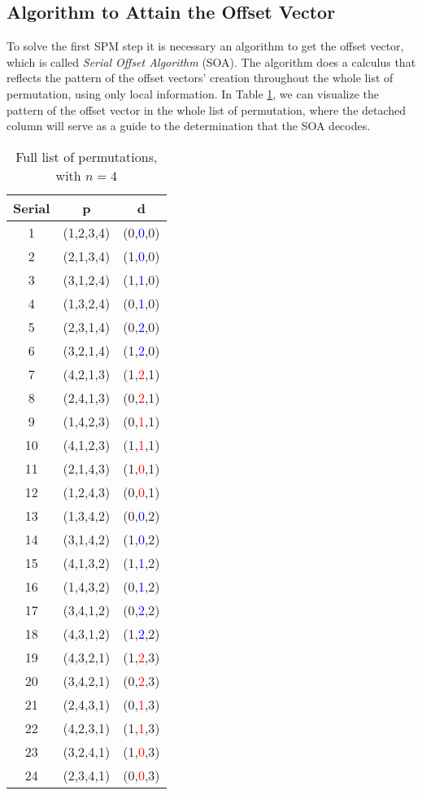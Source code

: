 \documentclass {amsart}
\newcommand{\azero}{\textcolor{blue}{0}}
\newcommand{\aum}{\textcolor{blue}{1}}
\newcommand{\adois}{\textcolor{blue}{2}}
\newcommand{\rzero}{\textcolor{red}{0}}
\newcommand{\rum}{\textcolor{red}{1}}
\newcommand{\rdois}{\textcolor{red}{2}}
\begin{document}
\subsection*{Algorithm to Attain the Offset Vector}
To solve the first SPM step it is necessary an algorithm to get
the offset vector, which is called \emph{Serial Offset Algorithm}
(SOA). The algorithm does a calculus that reflects the pattern of
the offset vectors' creation throughout the whole list of
permutation, using only local information. In Table \ref{table},
we can visualize the pattern of the offset vector in the whole
list of permutation, where the detached column will serve as a
guide to the determination that the SOA decodes.
\begin{table}
  \centering
  \caption{Full list of permutations, with {$n = 4$}}
  \label{table}
\begin{tabular}{c|c|c}
 \hline
   Serial  &p  &d\\
 \hline
    1   &(1,2,3,4)  &(0,\azero,0)\\
  \hline
    2   &(2,1,3,4)  &(1,\azero,0)\\
  \hline
    3   &(3,1,2,4)  &(1,\aum,0)\\
  \hline
    4   &(1,3,2,4)  &(0,\aum,0)\\
  \hline
    5   &(2,3,1,4)  &(0,\adois,0)\\
  \hline
    6   &(3,2,1,4)  &(1,\adois,0)\\
  \hline
    7   &(4,2,1,3)  &(1,\rdois,1)\\
  \hline
    8   &(2,4,1,3)  &(0,\rdois,1)\\
  \hline
    9   &(1,4,2,3)  &(0,\rum,1)\\
  \hline
    10  &(4,1,2,3)  &(1,\rum,1)\\
  \hline
    11  &(2,1,4,3)  &(1,\rzero,1)\\
  \hline
    12  &(1,2,4,3)  &(0,\rzero,1)\\
  \hline
    13  &(1,3,4,2)  &(0,\azero,2)\\
  \hline
    14  &(3,1,4,2)  &(1,\azero,2)\\
  \hline
    15  &(4,1,3,2)  &(1,\aum,2)\\
  \hline
    16  &(1,4,3,2)  &(0,\aum,2)\\
  \hline
    17  &(3,4,1,2)  &(0,\adois,2)\\
  \hline
    18  &(4,3,1,2)  &(1,\adois,2)\\
  \hline
    19  &(4,3,2,1)  &(1,\rdois,3)\\
  \hline
    20  &(3,4,2,1)  &(0,\rdois,3)\\
  \hline
    21  &(2,4,3,1)  &(0,\rum,3)\\
  \hline
    22  &(4,2,3,1)  &(1,\rum,3)\\
  \hline
    23  &(3,2,4,1)  &(1,\rzero,3)\\
  \hline
    24  &(2,3,4,1)  &(0,\rzero,3)\\
  \hline
 \end{tabular}
\end{table}
\end{document}
